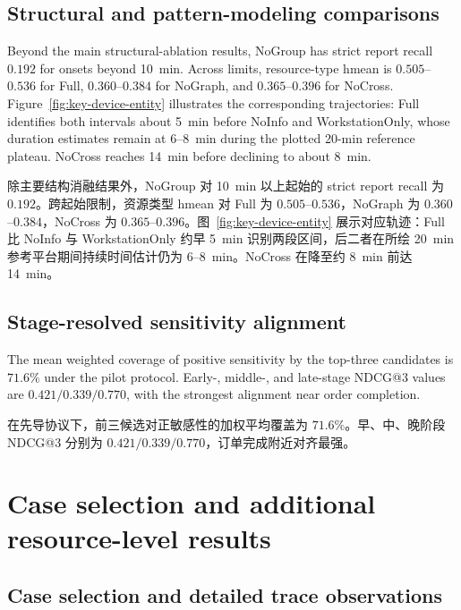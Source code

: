 \documentclass[a4paper,fleqn]{cas-dc}
\newcommand{\zhpara}[1]{%
  \par\begingroup\small\color{black!72}\noindent #1\par\endgroup}
\begin{document}
\subsection{Structural and pattern-modeling comparisons}

Beyond the main structural-ablation results, NoGroup has strict report recall $0.192$ for onsets beyond 10~min. Across limits, resource-type hmean is $0.505$--$0.536$ for Full, $0.360$--$0.384$ for NoGraph, and $0.365$--$0.396$ for NoCross. Figure~\ref{fig:key-device-entity} illustrates the corresponding trajectories: Full identifies both intervals about 5~min before NoInfo and WorkstationOnly, whose duration estimates remain at 6--8~min during the plotted 20-min reference plateau. NoCross reaches 14~min before declining to about 8~min.

\zhpara{除主要结构消融结果外，NoGroup 对 10~min 以上起始的 strict report recall 为 $0.192$。跨起始限制，资源类型 hmean 对 Full 为 $0.505$--$0.536$，NoGraph 为 $0.360$--$0.384$，NoCross 为 $0.365$--$0.396$。图~\ref{fig:key-device-entity} 展示对应轨迹：Full 比 NoInfo 与 WorkstationOnly 约早 5~min 识别两段区间，后二者在所绘 20~min 参考平台期间持续时间估计仍为 6--8~min。NoCross 在降至约 8~min 前达 14~min。}







\subsection{Stage-resolved sensitivity alignment}

The mean weighted coverage of positive sensitivity by the top-three candidates is $71.6\%$ under the pilot protocol. Early-, middle-, and late-stage NDCG@3 values are $0.421/0.339/0.770$, with the strongest alignment near order completion. 

\zhpara{在先导协议下，前三候选对正敏感性的加权平均覆盖为 $71.6\%$。早、中、晚阶段 NDCG@3 分别为 $0.421/0.339/0.770$，订单完成附近对齐最强。}


\section{Case selection and additional resource-level results}\label{app:case-details}

\subsection{Case selection and detailed trace observations}
\end{document}
